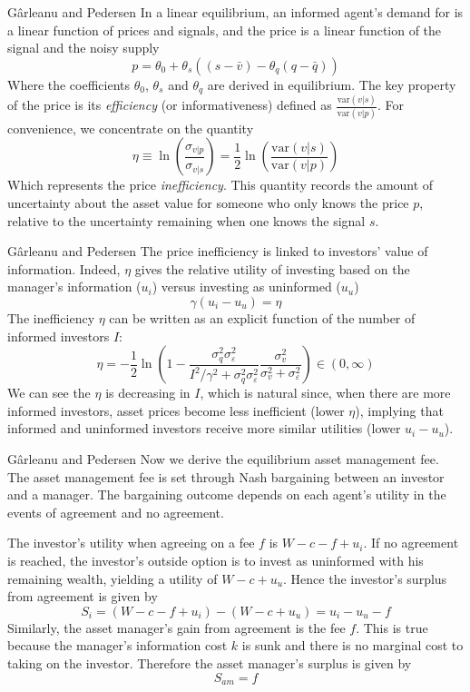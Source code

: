 \documentclass[aspectratio=169,xcolor=dvipsnames]{beamer}
\begin{document}
\begin{frame}{G\^arleanu and Pedersen}
    In a linear equilibrium, an informed agent's demand for is a linear function of prices and signals, and the price is a linear function of the signal and the noisy supply
    \[
        p = \theta_0 + \theta_s ((s - \bar v) - \theta_q (q - \bar q))
    \]
    Where the coefficients $\theta_0$, $\theta_s$ and $\theta_q$ are derived in equilibrium. The key property of the price is its \emph{efficiency} (or informativeness) defined as $\frac{\mathrm{var}(v|s)}{\mathrm{var}(v|p)}$. For convenience, we concentrate on the quantity
    \[
        \eta \equiv \ln \left( \frac{\sigma_{v|p}}{\sigma_{v|s}}\right) = \frac{1}{2} \ln \left( \frac{\mathrm{var}(v|s)}{\mathrm{var}(v|p)}\right)
    \]
    Which represents the price \emph{inefficiency}. This quantity records the amount of uncertainty about the asset value for someone who only knows the price $p$, relative to the uncertainty remaining when one knows the signal $s$.
\end{frame}

\begin{frame}{G\^arleanu and Pedersen}
    The price inefficiency is linked to investors' value of information. Indeed, $\eta$ gives the relative utility of investing based on the manager's information ($u_i$) versus investing as uninformed ($u_u$)
    \[
        \gamma (u_i - u_u) = \eta
    \]
    The inefficiency $\eta$ can be written as an explicit function of the number of informed investors $I$:
    \[
        \eta = -\frac{1}{2} \ln \left( 1 - \frac{\sigma_q^2 \sigma_\varepsilon^2}{I^2/\gamma^2 + \sigma_q^2 \sigma_\varepsilon^2} \frac{\sigma_v^2}{\sigma_v^2 + \sigma_\varepsilon^2}\right) \in (0, \infty)
    \]
    We can see the $\eta$ is decreasing in $I$, which is natural since, when there are more informed investors, asset prices become less inefficient (lower $\eta$), implying that informed and uninformed investors receive more similar utilities (lower $u_i - u_u$).
\end{frame}

\begin{frame}{G\^arleanu and Pedersen}
    Now we derive the equilibrium asset management fee. The asset management fee is set through Nash bargaining between an investor and a manager. The bargaining outcome depends on each agent's utility in the events of agreement and no agreement.

    The investor's utility when agreeing on a fee $f$ is $W - c - f + u_i$. If no agreement is reached, the investor's outside option is to invest as uninformed with his remaining wealth, yielding a utility of $W - c + u_u$. Hence the investor's surplus from agreement is given by
    \[
        S_i = (W - c - f + u_i) - (W - c + u_u) = u_i - u_u - f
    \]
    Similarly, the asset manager's gain from agreement is the fee $f$. This is true because the manager's information cost $k$ is sunk and there is no marginal cost to taking on the investor. Therefore the asset manager's surplus is given by
    \[
        S_{am} = f
    \]
\end{frame}
\end{document}
